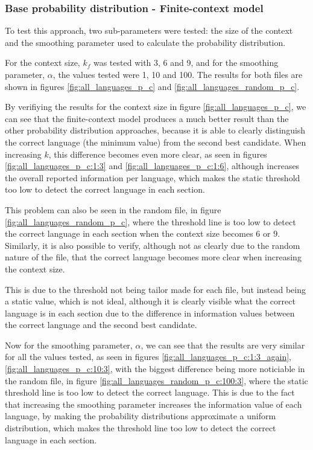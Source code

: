 \documentclass{article}
\begin{document}
\subsubsection{Base probability distribution - Finite-context model}
\label{subsubsec:results_locate_lang_first_order_fcm}

To test this approach, two sub-parameters were tested: the size of the context and the smoothing parameter used to calculate the probability distribution.

For the context size, $k_f$ was tested with 3, 6 and 9, and for the smoothing parameter, $\alpha$, the values tested were 1, 10 and 100.
The results for both files are shown in figures \ref{fig:all_languages_p_c} and \ref{fig:all_languages_random_p_c}.

By verifiying the results for the context size in figure \ref{fig:all_languages_p_c}, we can see that the finite-context model produces a much better result than the other probability distribution approaches,
because it is able to clearly distinguish the correct language (the minimum value) from the second best candidate.
When increasing $k$, this difference becomes even more clear, as seen in figures \ref{fig:all_languages_p_c:1:3} and \ref{fig:all_languages_p_c:1:6}, %
although increases the overall reported information per language, which makes the static threshold too low to detect the correct language in each section.

This problem can also be seen in the random file, in figure \ref{fig:all_languages_random_p_c}, where the threshold line is too low to detect the correct language in each section when the context size
becomes $6$ or $9$.
Similarly, it is also possible to verify, although not as clearly due to the random nature of the file, that the correct language becomes more clear when increasing the context size.

This is due to the threshold not being tailor made for each file, but instead being a static value, which is not ideal, although it is clearly visible what the correct language is
in each section due to the difference in information values between the correct language and the second best candidate.

Now for the smoothing parameter, $\alpha$, we can see that the results are very similar for all the values tested, as seen in figures \ref{fig:all_languages_p_c:1:3_again}, \ref{fig:all_languages_p_c:10:3},
with the biggest difference being more noticiable in the random file, in figure \ref{fig:all_languages_random_p_c:100:3}, where the static threshold line is too low to detect the correct language.
This is due to the fact that increasing the smoothing parameter increases the information value of each language, by making the probability distributions approximate a uniform distribution, which makes the threshold line too low to detect the correct language in each section.
\end{document}
